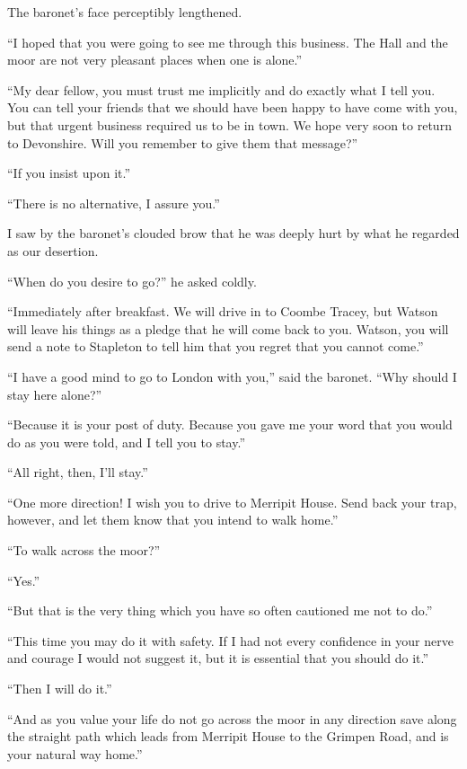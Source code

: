 \documentclass[paper=5.5in:8.5in,BCOR=7mm,twoside,DIV=calc,12pt,usegeometry,openany,chapterprefix,endperiod]{scrbook} %
\begin{document}
The baronet's face perceptibly lengthened.

\enquote{I hoped that you were going to see me through this business. The Hall and the moor are not very pleasant places when one is alone.}

\enquote{My dear fellow, you must trust me implicitly and do exactly what I tell you. You can tell your friends that we should have been happy to have come with you, but that urgent business required us to be in town. We hope very soon to return to Devonshire. Will you remember to give them that message?}

\enquote{If you insist upon it.}

\enquote{There is no alternative, I assure you.}

I saw by the baronet's clouded brow that he was deeply hurt by what he regarded as our desertion.

\enquote{When do you desire to go?} he asked coldly.

\enquote{Immediately after breakfast. We will drive in to Coombe \newline Tracey, but Watson will leave his things as a pledge that he will come back to you. Watson, you will send a note to Stapleton to tell him that you regret that you cannot come.}

\enquote{I have a good mind to go to London with you,} said the baronet. \enquote{Why should I stay here alone?}

\enquote{Because it is your post of duty. Because you gave me your word that you would do as you were told, and I tell you to stay.}

\enquote{All right, then, I'll stay.}

\enquote{One more direction! I wish you to drive to Merripit House. Send back your trap, however, and let them know that you intend to walk home.}

\enquote{To walk across the moor?}

\enquote{Yes.}

\enquote{But that is the very thing which you have so often cautioned me not to do.}

\enquote{This time you may do it with safety. If I had not every confidence in your nerve and courage I would not suggest it, but it is essential that you should do it.}

\enquote{Then I will do it.}

\enquote{And as you value your life do not go across the moor in any direction save along the straight path which leads from Merripit House to the Grimpen Road, and is your natural way home.}
\end{document}
